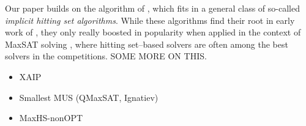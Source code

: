 Our paper builds on the algorithm of \citet{ignatiev2015smallest}, which fits in a general class of so-called \emph{implicit hitting set algorithms}.
While these algorithms find their root in early work of \citet{reiter}, they only really boosted in popularity when applied in the context of MaxSAT solving \cite{variousBacchuspapers}, where hitting set--based solvers are often among the best solvers in the competitions. 
SOME MORE ON THIS.



\begin{itemize}
    \item XAIP
    \item Smallest MUS (QMaxSAT, Ignatiev)
    \item MaxHS-nonOPT
\end{itemize}
